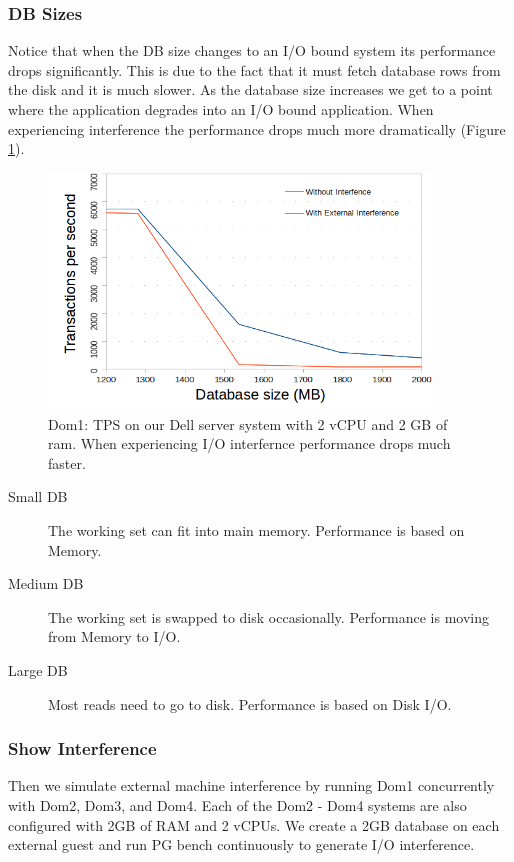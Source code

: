 \subsubsection{DB Sizes}
Notice that when the DB size changes to an I/O bound system its performance drops significantly.  
This is due to the fact that it must fetch database rows from the disk and it is much slower.  
As the database size increases we get to a point where the application degrades into an I/O bound application.  
When experiencing interference the performance drops much more dramatically (Figure \ref{medIO}).  
\begin{figure}[h]
  \begin{center}
  \includegraphics[width=4in]{images/MedScale.png}
  \caption{Dom1: TPS on our Dell server system with 2 vCPU and 2 GB of ram. When experiencing I/O interfernce performance drops much faster.}
  \label{medIO}
  \end{center}
\end{figure}

\begin{description}
  \item[Small DB] The working set can fit into main memory.  Performance is based on Memory.
  \item[Medium DB] The working set is swapped to disk occasionally. Performance is moving from Memory to I/O.
  \item[Large DB] Most reads need to go to disk.  Performance is based on Disk I/O.
\end{description}

\subsubsection {Show Interference}
Then we simulate external machine interference by running Dom1 concurrently with Dom2, Dom3, and Dom4. Each of the Dom2 - Dom4 systems are also configured with 2GB of RAM and 2 vCPUs.  We create a 2GB database on each external guest and run PG bench continuously to generate I/O interference.  

